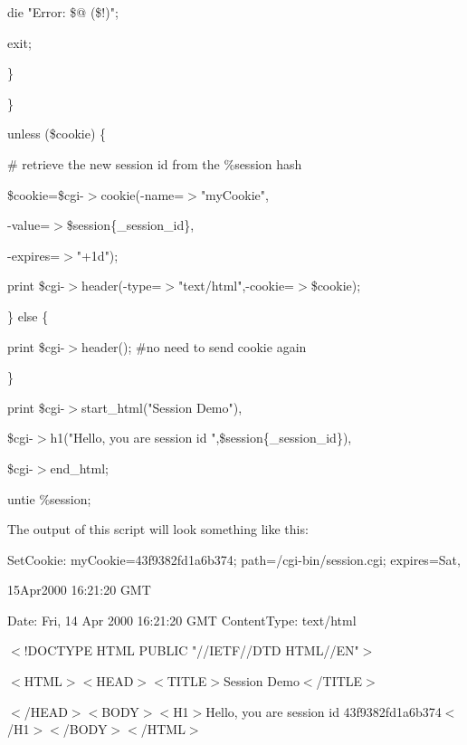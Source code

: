 \documentclass[a4paper,11pt]{book}
\begin{document}
\noindent die "Error: \$@ (\$!)";

\noindent exit;

\noindent \}

\noindent \}

\noindent 

\noindent unless (\$cookie) \{

\noindent \# retrieve the new session id from the \%session hash

\noindent \$cookie=\$cgi-$>$cookie(-name=$>$"myCookie",

\noindent -value=$>$\$session\{\_session\_id\},

\noindent -expires=$>$"+1d");

\noindent print \$cgi-$>$header(-type=$>$"text/html",-cookie=$>$\$cookie);

\noindent \} else \{

\noindent print \$cgi-$>$header(); \#no need to send cookie again

\noindent \}

\noindent 

\noindent print \$cgi-$>$start\_html("Session Demo"),

\noindent \$cgi-$>$h1("Hello, you are session id ",\$session\{\_session\_id\}),

\noindent \$cgi-$>$end\_html;

\noindent 

\noindent untie \%session;

\noindent 

\noindent The output of this script will look something like this:

\noindent 

\noindent 

\noindent SetCookie: myCookie=43f9382fd1a6b374; path=/cgi-bin/session.cgi; expires=Sat,

\noindent 15Apr2000 16:21:20 GMT

\noindent Date: Fri, 14 Apr 2000 16:21:20 GMT ContentType: text/html

\noindent 

\noindent $<$!DOCTYPE HTML PUBLIC "//IETF//DTD HTML//EN"$>$

\noindent $<$HTML$>$$<$HEAD$>$$<$TITLE$>$Session Demo$<$/TITLE$>$

\noindent $<$/HEAD$>$$<$BODY$>$$<$H1$>$Hello, you are session id 43f9382fd1a6b374$<$/H1$>$$<$/BODY$>$$<$/HTML$>$

\noindent 

\noindent 
\end{document}
